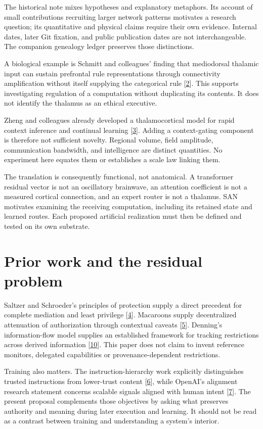 \documentclass[11pt,letterpaper]{article}
\begin{document}
The historical note mixes hypotheses and explanatory metaphors. Its account of small contributions recruiting larger network patterns motivates a research question; its quantitative and physical claims require their own evidence. Internal dates, later Git fixation, and public publication dates are not interchangeable. The companion genealogy ledger preserves those distinctions.

A biological example is Schmitt and colleagues' finding that mediodorsal thalamic input can sustain prefrontal rule representations through connectivity amplification without itself supplying the categorical rule [\hyperref[ref:2]{2}]. This supports investigating regulation of a computation without duplicating its contents. It does not identify the thalamus as an ethical executive.

Zheng and colleagues already developed a thalamocortical model for rapid context inference and continual learning [\hyperref[ref:3]{3}]. Adding a context-gating component is therefore not sufficient novelty. Regional volume, field amplitude, communication bandwidth, and intelligence are distinct quantities. No experiment here equates them or establishes a scale law linking them.

The translation is consequently functional, not anatomical. A transformer residual vector is not an oscillatory brainwave, an attention coefficient is not a measured cortical connection, and an expert router is not a thalamus. SAN motivates examining the receiving computation, including its retained state and learned routes. Each proposed artificial realization must then be defined and tested on its own substrate.

\section{Prior work and the residual problem}

Saltzer and Schroeder's principles of protection supply a direct precedent for complete mediation and least privilege [\hyperref[ref:4]{4}]. Macaroons supply decentralized attenuation of authorization through contextual caveats [\hyperref[ref:5]{5}]. Denning's information-flow model supplies an established framework for tracking restrictions across derived information [\hyperref[ref:10]{10}]. This paper does not claim to invent reference monitors, delegated capabilities or provenance-dependent restrictions.

Training also matters. The instruction-hierarchy work explicitly distinguishes trusted instructions from lower-trust content [\hyperref[ref:6]{6}], while OpenAI's alignment research statement concerns scalable signals aligned with human intent [\hyperref[ref:7]{7}]. The present proposal complements those objectives by asking what preserves authority and meaning during later execution and learning. It should not be read as a contrast between training and understanding a system's interior.
\end{document}
